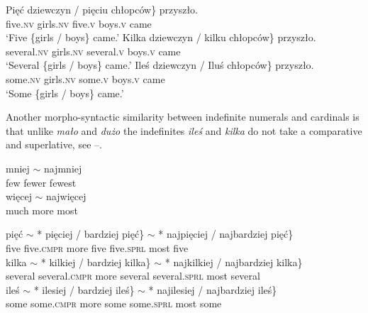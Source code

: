 \documentclass[output=paper,
]{langscibook}
\begin{document}
	\ea \label{ex:gender-agreement-cardinals} \ea \gll \minsp{\{} Pięć dziewczyn / pięciu chłopców\} przyszło.\\
	{} five.\textsc{nv} girls.\textsc{nv} {} five.\textsc{v} boys.\textsc{v} came\\ 
	\glt `Five \{girls / boys\} came.'
	\ex \gll \minsp{\{} Kilka dziewczyn / kilku chłopców\} przyszło.\\
	{} several.\textsc{nv} girls.\textsc{nv} {} several.\textsc{v} boys.\textsc{v} came\\
	\glt `Several \{girls / boys\} came.'
	\ex \gll \minsp{\{} Ileś dziewczyn / Iluś chłopców\} przyszło.\\
	{} some.\textsc{nv} girls.\textsc{nv} {} some.\textsc{v} boys.\textsc{v} came\\
	\glt `Some \{girls / boys\} came.'
	\z
    \z
    
	\noindent Another morpho-syntactic similarity between indefinite numerals and cardinals is that unlike \textit{mało} and \textit{dużo} the indefinites \textit{ileś} and \textit{kilka} do not take a comparative and superlative, see --.
	
	\ea \label{ex:comparison-quantifiers} \ea {} {mniej $\sim$} najmniej\\
	few fewer fewest\\ 
	\ex {} {więcej $\sim$} najwięcej\\
	much more most\\
	\z
    \z
    
	\ea \label{ex:comparison-cardinals} \ea \gll pięć $\sim$ *\hspace{-2pt} \minsp{\{} pięciej / bardziej pięć\} $\sim$ *\hspace{-2pt} \minsp{\{} najpięciej / najbardziej {pięć\}}\\
	five {} {} {} five.\textsc{cmpr} {} more five {} {} {} five.\textsc{sprl} {} most five\\
	\ex \gll kilka $\sim$ *\hspace{-2pt} \minsp{\{} kilkiej / bardziej {kilka\}} $\sim$ *\hspace{-2pt} \minsp{\{} najkilkiej / najbardziej {kilka\}}\\
	several {} {} {} several.\textsc{cmpr} {} more several {} {} {} several.\textsc{sprl} {} most several\\
	\ex \gll ileś $\sim$ *\hspace{-2pt} \minsp{\{} ilesiej / bardziej {ileś\}} $\sim$ *\hspace{-2pt} \minsp{\{} najilesiej / najbardziej {ileś\}}\\
	some {} {} {} some.\textsc{cmpr} {} more some {} {} {} some.\textsc{sprl} {} most some\\
	\z
    \z
    
\end{document}
